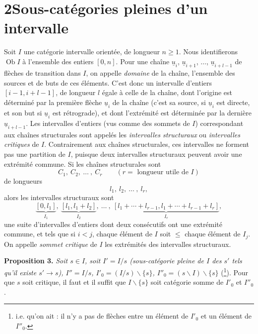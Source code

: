 \section*{2\quad Sous-catégories pleines d'un intervalle}

Soit $I$ une catégorie intervalle orientée, de longueur $n \geq 1$. Nous identifierons $\operatorname{Ob} I$ à l'ensemble des entiers $[0,n]$. Pour une chaîne $\underline{u}_i$, $\underline{u}_{i+1}$, $\ldots$, $\underline{u}_{i+l-1}$ de flèches de transition dans $I$, on appelle \textit{domaine} de la chaîne, l'ensemble des sources et de buts de ces éléments. C'est donc un intervalle d'entiers $[i-1, i+l-1]$, de longueur $l$ égale à celle de la chaîne, dont l'origine est déterminé %
par la première flèche $\underline{u}_i$ de la chaîne (c'est sa source, si $\underline{u}_i$ est directe, et son but si $\underline{u}_i$ est rétrograde), et dont l'extrémité est déterminée par la dernière $\underline{u}_{i+l-1}$. Les intervalles d'entiers (vus comme des sommets de $I$) correspondant aux chaînes structurales sont appelés les \textit{intervalles structuraux} ou \textit{intervalles critiques} de $I$. Contrairement aux chaînes structurales, ces intervalles ne forment pas une partition de $I$, puisque deux intervalles structuraux peuvent avoir une extrémité commune. Si les chaînes structurales sont
\[
C_1,\ C_2,\ \ldots\ ,\ C_r \qquad (r = \text{ longueur utile de } I)
\]
de longueurs
\[
l_1,\ l_2,\ \ldots\ ,\ l_r,
\]
alors les intervalles structuraux sont
\[
\underbrace{[0,l_1]}_{I_1},\ \underbrace{[l_1,l_1+l_2]}_{I_2},\ \ldots\ ,\ \underbrace{[l_1+\cdots+l_{r-1},l_1+\cdots+l_{r-1}+l_r]}_{I_r},
\]
une suite d'intervalles d'entiers dont deux consécutifs ont une extrémité commune, et tels que si $i < j$, chaque élément de $I$ %
soit $\leq$ chaque élément de $I_j$. On appelle \textit{sommet critique} de $I$ les extrémités des intervalles structuraux.

\textbf{Proposition 3.} \textit{Soit $s \in I$, soit $I' = I/s$ (sous-catégorie pleine de $I$ des $s'$ tels qu'il existe $s' \longrightarrow s$), $I'' = I/s$, $I'_0 = (I/s)\backslash\{s\}$, $I''_0 = (s\backslash I)\backslash\{s\}$} (\footnote[3]{i.e. qu'on ait : il n'y a pas de flèches entre un élément de $I'_0$ et un élément de $I''_0$.}). Pour que $s$ soit critique, il faut et il suffit que $I\backslash\{s\}$ soit catégorie somme de $I'_0$ et $I''_0$.



